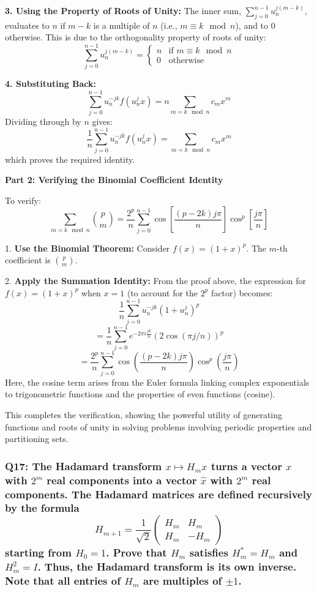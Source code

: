 \documentclass[8pt]{article}
\begin{document}
\textbf{3. Using the Property of Roots of Unity:}
   The inner sum, \(\sum_{j=0}^{n-1} u_n^{j(m-k)}\), evaluates to \( n \) if \( m-k \) is a multiple of \( n \) (i.e., \( m \equiv k \mod n \)), and to 0 otherwise. This is due to the orthogonality property of roots of unity:
   \[
   \sum_{j=0}^{n-1} u_n^{j(m-k)} = \begin{cases}
   n & \text{if } m \equiv k \mod n \\
   0 & \text{otherwise}
   \end{cases}
   \]

\textbf{4. Substituting Back:}
   \[
   \sum_{j=0}^{n-1} u_n^{-jk} f(u_n^j x) = n \sum_{m = k \mod n} c_m x^m
   \]
   Dividing through by \( n \) gives:
   \[
   \frac{1}{n} \sum_{j=0}^{n-1} u_n^{-jk} f(u_n^j x) = \sum_{m = k \mod n} c_m x^m
   \]
   which proves the required identity.

\textbf{Part 2: Verifying the Binomial Coefficient Identity}

To verify:
\[
\sum_{m = k \mod n} \binom{p}{m} = \frac{2^p}{n} \sum_{j=0}^{n-1} \cos \left[ \frac{(p - 2k)j\pi}{n} \right] \cos^p \left[ \frac{j\pi}{n} \right]
\]

1. \textbf{Use the Binomial Theorem:}
   Consider \( f(x) = (1 + x)^p \). The \( m \)-th coefficient is \( \binom{p}{m} \).

2. \textbf{Apply the Summation Identity:}
   From the proof above, the expression for \( f(x) = (1 + x)^p \) when \( x = 1 \) (to account for the \( 2^p \) factor) becomes:
   \[
   \frac{1}{n} \sum_{j=0}^{n-1} u_n^{-jk} (1 + u_n^j)^p
   \]
   \[
   = \frac{1}{n} \sum_{j=0}^{n-1} e^{-2\pi i \frac{jk}{n}} (2 \cos(\pi j/n))^p
   \]
   \[
   = \frac{2^p}{n} \sum_{j=0}^{n-1} \cos \left(\frac{(p - 2k)j\pi}{n}\right) \cos^p \left(\frac{j\pi}{n}\right)
   \]
   Here, the cosine term arises from the Euler formula linking complex exponentials to trigonometric functions and the properties of even functions (cosine).

This completes the verification, showing the powerful utility of generating functions and roots of unity in solving problems involving periodic properties and partitioning sets.

\subsubsection*{Q17:
The Hadamard transform \(x \mapsto H_m x\) turns a vector \(x\) with \(2^m\) real components into a vector \(\hat{x}\) with \(2^m\) real components. The Hadamard matrices are defined recursively by the formula
\[
H_{m+1} = \frac{1}{\sqrt{2}} \begin{pmatrix} H_m & H_m \\ H_m & -H_m \end{pmatrix}
\]
starting from \(H_0 = 1\). Prove that \(H_m\) satisfies \(H_m^* = H_m\) and \(H_m^2 = I\). Thus, the Hadamard transform is its own inverse. Note that all entries of \(H_m\) are multiples of \(\pm 1\).}
\end{document}
